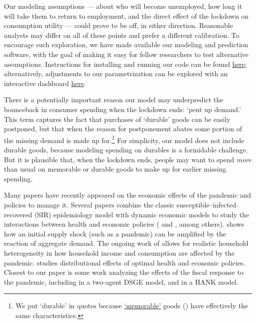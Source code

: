 \documentclass[titlepage,a4paper]{\econtex}
\begin{document}
Our modeling assumptions --- about who will become unemployed, how long it will take them to return to employment, and the direct effect of the lockdown on consumption utility --- could prove to be off, in either direction.
Reasonable analysts may differ on all of these points and prefer a different calibration.
To encourage such exploration, we have made available our modeling and prediction software, with the goal of making it easy for fellow researchers to test alternative assumptions.
Instructions for installing and running our code can be found \href{https://github.com/econ-ark/Pandemic#reproduction-instructions}{here}; alternatively, adjustments to our parametrization can be explored with an interactive dashboard \href{http://econ-ark.org/pandemicdashboard}{here}.

There is a potentially important reason our model may underpredict the bounceback in consumer spending when the lockdown ends: `pent up demand.'
This term captures the fact that purchases of `durable' goods can be easily postponed, but that when the reason for postponement abates some portion of the missing demand is made up for.\footnote{We put `durable' in quotes because \href{https://www.nber.org/papers/w19386}{`memorable'} goods (\cite{hkpMemory}) have effectively the same characteristics.}
For simplicity, our model does not include durable goods, because modeling spending on durables is a formidable challenge.
But it is plausible that, when the lockdown ends, people may want to spend \textit{more} than usual on memorable or durable goods to make up for earlier missing spending.



Many papers have recently appeared on the economic effects of the pandemic and policies to manage it.
Several papers combine the classic susceptible--infected--recovered (SIR) epidemiology model with dynamic economic models to study the interactions between health and economic policies (\cite{ert_covid} and \cite{aal_covid}, among others).
\cite{covidMacroImpl} shows how an initial supply shock (such as a pandemic) can be amplified by the reaction of aggregate demand.
The ongoing work of \cite{kmv_pandemics} allows for realistic household heterogeneity in how household income and consumption are affected by the pandemic.
\cite{healthWealth} studies distributional effects of optimal health and economic policies.
Closest to our paper is some work analyzing the effects of the fiscal response to the pandemic, including \cite{faria_FPpandemic} in a two-agent DSGE model, and \cite{bayer_corona} in a HANK model.
\end{document}
